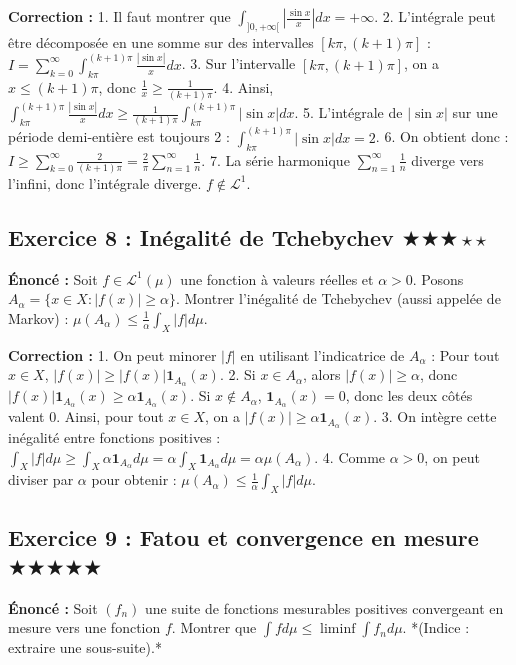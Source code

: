 \documentclass[11pt,a4paper]{article}
\begin{document}
\textbf{Correction :}
1. Il faut montrer que $\int_{]0, +\infty[} \left| \frac{\sin x}{x} \right| dx = +\infty$.
2. L'intégrale peut être décomposée en une somme sur des intervalles $[k\pi, (k+1)\pi]$ :
   $I = \sum_{k=0}^{\infty} \int_{k\pi}^{(k+1)\pi} \frac{|\sin x|}{x} dx$.
3. Sur l'intervalle $[k\pi, (k+1)\pi]$, on a $x \le (k+1)\pi$, donc $\frac{1}{x} \ge \frac{1}{(k+1)\pi}$.
4. Ainsi, $\int_{k\pi}^{(k+1)\pi} \frac{|\sin x|}{x} dx \ge \frac{1}{(k+1)\pi} \int_{k\pi}^{(k+1)\pi} |\sin x| dx$.
5. L'intégrale de $|\sin x|$ sur une période demi-entière est toujours 2 :
   $\int_{k\pi}^{(k+1)\pi} |\sin x| dx = 2$.
6. On obtient donc : $I \ge \sum_{k=0}^{\infty} \frac{2}{(k+1)\pi} = \frac{2}{\pi} \sum_{n=1}^{\infty} \frac{1}{n}$.
7. La série harmonique $\sum_{n=1}^{\infty} \frac{1}{n}$ diverge vers l'infini, donc l'intégrale diverge. $f \notin \mathcal{L}^1$.


\subsection*{Exercice 8 : Inégalité de Tchebychev \quad $\bigstar\bigstar\bigstar\star\star$}
\textbf{Énoncé :}
Soit $f \in \mathcal{L}^1(\mu)$ une fonction à valeurs réelles et $\alpha > 0$.
Posons $A_\alpha = \{x \in X : |f(x)| \ge \alpha\}$.
Montrer l'inégalité de Tchebychev (aussi appelée de Markov) :
$\mu(A_\alpha) \le \frac{1}{\alpha} \int_X |f| d\mu$.

\textbf{Correction :}
1. On peut minorer $|f|$ en utilisant l'indicatrice de $A_\alpha$ :
   Pour tout $x \in X$, $|f(x)| \ge |f(x)| \mathbf{1}_{A_\alpha}(x)$.
2. Si $x \in A_\alpha$, alors $|f(x)| \ge \alpha$, donc $|f(x)| \mathbf{1}_{A_\alpha}(x) \ge \alpha \mathbf{1}_{A_\alpha}(x)$.
   Si $x \notin A_\alpha$, $\mathbf{1}_{A_\alpha}(x) = 0$, donc les deux côtés valent 0.
   Ainsi, pour tout $x \in X$, on a $|f(x)| \ge \alpha \mathbf{1}_{A_\alpha}(x)$.
3. On intègre cette inégalité entre fonctions positives :
   $\int_X |f| d\mu \ge \int_X \alpha \mathbf{1}_{A_\alpha} d\mu = \alpha \int_X \mathbf{1}_{A_\alpha} d\mu = \alpha \mu(A_\alpha)$.
4. Comme $\alpha > 0$, on peut diviser par $\alpha$ pour obtenir :
   $\mu(A_\alpha) \le \frac{1}{\alpha} \int_X |f| d\mu$.


\subsection*{Exercice 9 : Fatou et convergence en mesure \quad $\bigstar\bigstar\bigstar\bigstar\bigstar$}
\textbf{Énoncé :}
Soit $(f_n)$ une suite de fonctions mesurables positives convergeant en mesure vers une fonction $f$.
Montrer que $\int f d\mu \le \liminf \int f_n d\mu$.
*(Indice : extraire une sous-suite).*
\end{document}
